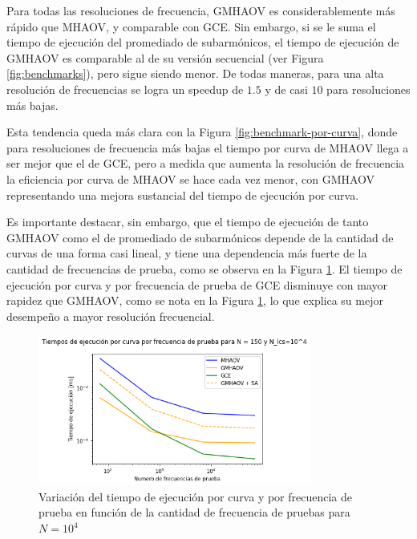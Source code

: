  Para todas las resoluciones de frecuencia, GMHAOV es considerablemente más rápido que MHAOV, y comparable con GCE. Sin embargo, si se le suma el tiempo de ejecución del promediado de subarmónicos, el tiempo de ejecución de GMHAOV es comparable al de su versión secuencial (ver Figura \ref{fig:benchmarks}), pero sigue siendo menor. De todas maneras, para una alta resolución de frecuencias se logra un speedup de $1.5$ y de casi $10$ para resoluciones más bajas.

Esta tendencia queda más clara con la Figura \ref{fig:benchmark-por-curva}, donde para resoluciones de frecuencia más bajas el tiempo por curva de MHAOV llega a ser mejor que el de GCE, pero a medida que aumenta la resolución de frecuencia la eficiencia por curva de  MHAOV se hace cada vez menor, con GMHAOV representando una mejora sustancial del tiempo de ejecución por curva.

Es importante destacar, sin embargo, que el tiempo de ejecución de tanto GMHAOV como el de promediado de subarmónicos depende de la cantidad de curvas de una forma casi lineal, y tiene una dependencia más fuerte de la cantidad de frecuencias de prueba, como se observa en la Figura \ref{fig:benchmark-frecuencias-prueba}. El tiempo de ejecución por curva y por frecuencia de prueba de GCE disminuye con mayor rapidez que GMHAOV, como se nota en la Figura \ref{fig:benchmark-frecuencias-prueba}, lo que explica su mejor desempeño a mayor resolución frecuencial.

\begin{figure}[H]
    \centering
    \includegraphics[width=0.8\textwidth]{figs/benchmarks-frequency.png}
    \caption{Variación del tiempo de ejecución por curva y por frecuencia de prueba en función de la cantidad de frecuencia de pruebas para $N=10^{4}$}
    \label{fig:benchmark-frecuencias-prueba}
\end{figure}

